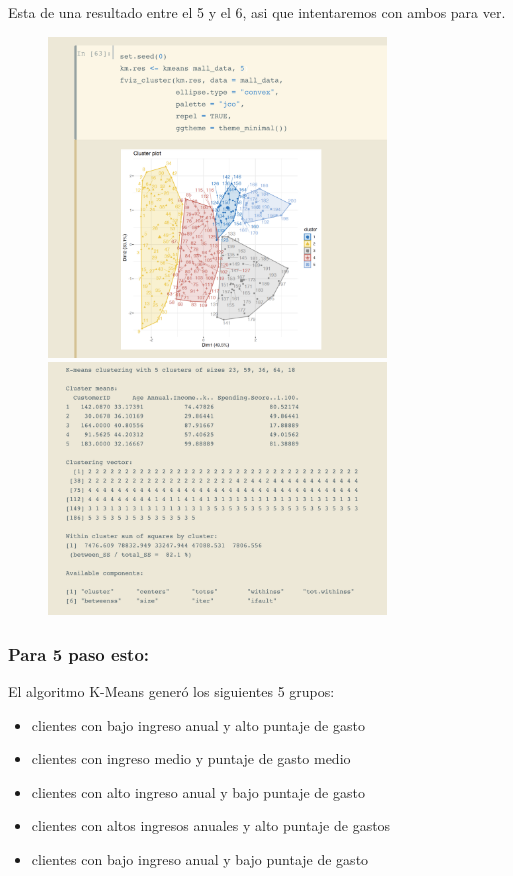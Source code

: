 \documentclass[12pt, fleqn]{report}                             %
\theoremstyle{break}                                            %
\begin{document}
            Esta de una resultado entre el 5 y el 6, asi que intentaremos con ambos para ver.

            \begin{figure}[ht!]
                \centering
                \includegraphics[width=0.8\textwidth]{k2}
                \includegraphics[width=0.8\textwidth]{k21}
            \end{figure}

            \subsubsection{Para 5 paso esto:}

            El algoritmo K-Means generó los siguientes 5 grupos:

            \begin{itemize}
                \item clientes con bajo  ingreso anual y  alto  puntaje de gasto
                \item clientes con ingreso  medio  y  puntaje de gasto  medio
                \item clientes con alto  ingreso anual y  bajo  puntaje de gasto
                \item clientes con altos  ingresos anuales y  alto  puntaje de gastos
                \item clientes con bajo  ingreso anual y  bajo  puntaje de gasto
            \end{itemize}
\end{document}
